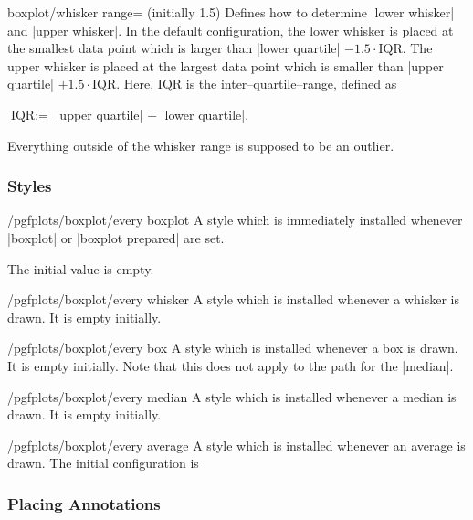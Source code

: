 \begin{pgfplotskey}{boxplot/whisker range= (initially 1.5)}
	Defines how to determine |lower whisker| and |upper whisker|. In the default configuration, the lower whisker is placed at the smallest data point which is larger than |lower quartile| $- 1.5 \cdot \text{IQR}$. The upper whisker is placed at the largest data point which is smaller than |upper quartile| $+ 1.5 \cdot \text{IQR}$. Here, $\text{IQR}$ is the inter--quartile--range, defined as

	$\text{IQR} := $ |upper quartile| $-$ |lower quartile|.

	Everything outside of the whisker range is supposed to be an outlier.
\end{pgfplotskey}
\endgroup

\subsubsection{Styles}
\begin{stylekey}{/pgfplots/boxplot/every boxplot}
	A style which is immediately installed whenever |boxplot| or |boxplot prepared| are set.

	The initial value is empty.
\end{stylekey}

\begin{stylekey}{/pgfplots/boxplot/every whisker}
	A style which is installed whenever a whisker is drawn. It is empty initially.
\end{stylekey}
\begin{stylekey}{/pgfplots/boxplot/every box}
	A style which is installed whenever a box is drawn. It is empty initially. Note that this does not apply to the path for the |median|.
\end{stylekey}
\begin{stylekey}{/pgfplots/boxplot/every median}
	A style which is installed whenever a median is drawn. It is empty initially.
\end{stylekey}
\begin{stylekey}{/pgfplots/boxplot/every average}
	A style which is installed whenever an average is drawn. The initial configuration is
\begin{codeexample}
\end{codeexample}
\end{stylekey}


\subsubsection{Placing Annotations}

